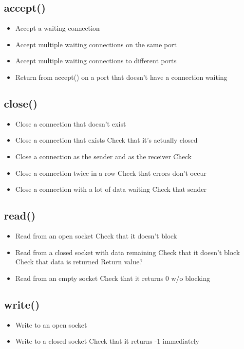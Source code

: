 \documentclass[]{article}
\begin{document}
\subsection{accept()}
\begin{itemize}
	\item Accept a waiting connection
	\item Accept multiple waiting connections on the same port
	\item Accept multiple waiting connections to different ports
	\item Return from accept() on a port that doesn't have a connection waiting
\end{itemize}
\subsection{close()}
\begin{itemize}
	\item Close a connection that doesn't exist
	\item Close a connection that exists
	\subitem Check that it's actually closed
	\item Close a connection as the sender and as the receiver
	\subitem Check 
	\item Close a connection twice in a row
	\subitem Check that errors don't occur
	\item Close a connection with a lot of data waiting
	\subitem Check that sender 
\end{itemize}
\subsection{read()}
\begin{itemize}
	\item Read from an open socket
	\subitem Check that it doesn't block
	\item Read from a closed socket with data remaining
	\subitem Check that it doesn't block
	\subitem Check that data is returned
	\subitem Return value?
	\item Read from an empty socket
	\subitem Check that it returns 0 w/o blocking
\end{itemize}
\subsection{write()}
\begin{itemize}
	\item Write to an open socket
	\item Write to a closed socket
	\subitem Check that it returns -1 immediately
\end{itemize}
\end{document}
